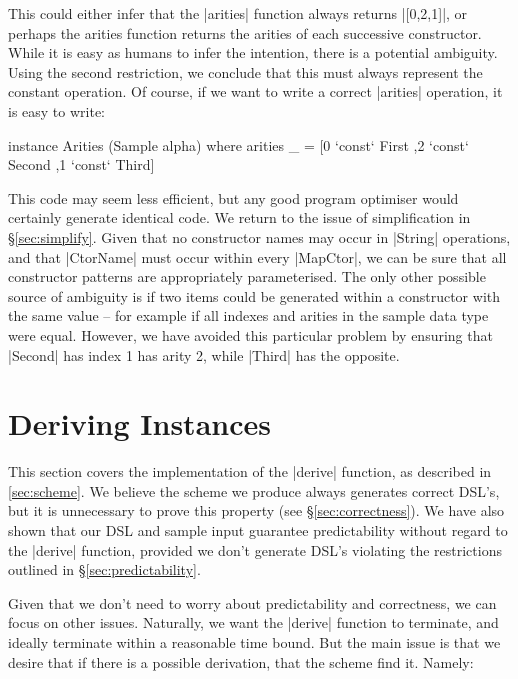 \documentclass[preprint,draft]{sigplanconf}
\begin{document}
This could either infer that the |arities| function always returns |[0,2,1]|, or perhaps the arities function returns the arities of each successive constructor. While it is easy as humans to infer the intention, there is a potential ambiguity. Using the second restriction, we conclude that this must always represent the constant operation. Of course, if we want to write a correct |arities| operation, it is easy to write:

\begin{code}
instance Arities (Sample alpha) where
    arities _ =  [0 `const` First{}
                 ,2 `const` Second{}
                 ,1 `const` Third{}]
\end{code}

This code may seem less efficient, but any good program optimiser would certainly generate identical code. We return to the issue of simplification in \S\ref{sec:simplify}. Given that no constructor names may occur in |String| operations, and that |CtorName| must occur within every |MapCtor|, we can be sure that all constructor patterns are appropriately parameterised. The only other possible source of ambiguity is if two items could be generated within a constructor with the same value -- for example if all indexes and arities in the sample data type were equal. However, we have avoided this particular problem by ensuring that |Second| has index 1 has arity 2, while |Third| has the opposite.

\section{Deriving Instances}
\label{sec:guess}

This section covers the implementation of the |derive| function, as described in \ref{sec:scheme}. We believe the scheme we produce always generates correct DSL's, but it is unnecessary to prove this property (see \S\ref{sec:correctness}). We have also shown that our DSL and sample input guarantee predictability without regard to the |derive| function, provided we don't generate DSL's violating the restrictions outlined in \S\ref{sec:predictability}.

Given that we don't need to worry about predictability and correctness, we can focus on other issues. Naturally, we want the |derive| function to terminate, and ideally terminate within a reasonable time bound. But the main issue is that we desire that if there is a possible derivation, that the scheme find it. Namely:
\end{document}
